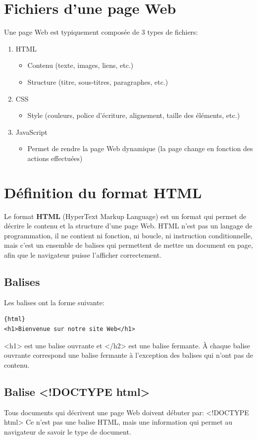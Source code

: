 \documentclass[a4paper,11pt]{article}
\begin{document}
\section{Fichiers d'une page Web}
Une page Web est typiquement composée de 3 types de fichiers:
\begin{enumerate}[label=\arabic*)]
\item HTML
\begin{itemize}
  \item Contenu (texte, images, liens, etc.)
  \item Structure (titre, sous-titres, paragraphes, etc.)
\end{itemize}
\item CSS
\begin{itemize}
  \item Style (couleurs, police d'écriture, alignement, taille des éléments, etc.)
\end{itemize}
\item JavaScript
\begin{itemize}
  \item Permet de rendre la page Web dynamique (la page change en fonction des actions effectuées)
\end{itemize}
\end{enumerate}

\section{Définition du format HTML}
Le format \textbf{HTML} (HyperText Markup Language) est un format qui permet de décrire le contenu et la structure d'une page Web. HTML n'est pas un langage de programmation, il ne contient ni fonction, ni boucle, ni instruction conditionnelle, mais c'est un ensemble de balises qui permettent de mettre un document en page, afin que le navigateur puisse l'afficher correctement.

\subsection{Balises}
Les balises ont la forme suivante:
\begin{verbatim}{html}
<h1>Bienvenue sur notre site Web</h1>
\end{verbatim}
<h1> est une balise ouvrante et </h2> est une balise fermante. À chaque balise ouvrante correspond une balise fermante à l'exception des balises qui n'ont pas de contenu.

\subsection{Balise <!DOCTYPE html>}
Tous documents qui décrivent une page Web doivent débuter par:  <!DOCTYPE html>
Ce n'est pas une balise HTML, mais une information qui permet au navigateur de savoir le type de document.
\end{document}
